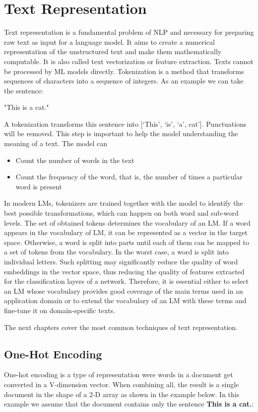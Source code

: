 \section{Text Representation}
Text representation is a fundamental problem of NLP and necessary for preparing raw text as input for a language model. It aims to create a numerical representation of the unstructured text and make them mathematically computable. It is also called text vectorization or feature extraction.\newline
Texts cannot be processed by ML models directly. Tokenization is a method that transforms sequences of characters into a sequence of integers. As an example we can take the sentence: \newline

\centerline{"This is a cat."} 

A tokenization transforms this sentence into [‘This’, ‘is’, ‘a’, cat’]. Punctuations will be removed. This step is important to help the model understanding the meaning of a text. The model can
\begin{itemize}
	\item Count the number of words in the text
	\item Count the frequency of the word, that is, the number of times a particular word is present
\end{itemize} 

In modern LMs, tokenizers are trained together with the model to identify the best possible transformations, which can happen on both word and sub-word levels. The set of obtained tokens determines the vocabulary of an LM. If a word appears in the vocabulary of LM, it can be represented as a vector in the target space. Otherwise, a word is split into parts until each of them can be mapped to a set of tokens from the vocabulary. In the worst case, a word is split into individual letters. Such splitting may significantly reduce the quality of word embeddings in the vector space, thus reducing the quality of features extracted for the classification layers of a network. Therefore, it is essential either to select an LM whose vocabulary provides good coverage of the main terms used in an application domain or to extend the vocabulary of an LM with these terms and fine-tune it on domain-specific texts. 

The next chapters cover the most common techniques of text representation.

\subsection{One-Hot Encoding}
One-hot encoding is a type of representation were words in a document get converted in a V-dimension vector. When combining all, the result is a single document in the shape of a 2-D array as shown in the example below. In this example we assume that the document contains only the sentence \textbf{This is a cat.}:

